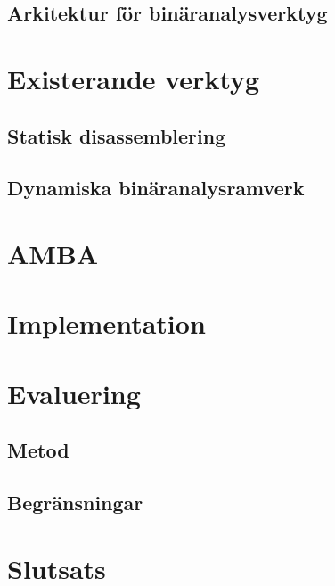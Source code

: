 \documentclass[12pt, a4paper]{report}
\begin{document}
\section{Arkitektur för binäranalysverktyg}


\chapter{Existerande verktyg}

\section{Statisk disassemblering}

\section{Dynamiska binäranalysramverk}


\chapter{AMBA}


\chapter{Implementation}


\chapter{Evaluering}

\section{Metod}

\section{Begränsningar}


\chapter{Slutsats}


\printbibliography
\end{document}
